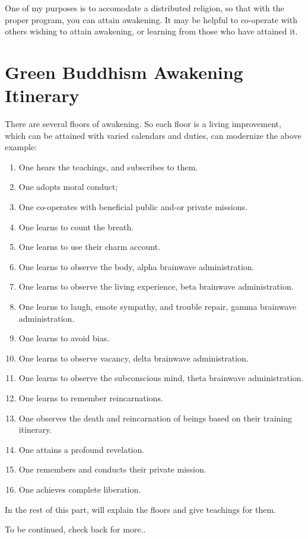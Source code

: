 One of my purposes is to accomodate a distributed religion, 
so that with the proper program, you can attain awakening.
It may be helpful to co-operate with others wishing to attain awakening,
or learning from those who have attained it.

\chapter{Green Buddhism Awakening Itinerary}
There are several floors of awakening. So each floor is a living improvement,
which can be attained with varied calendars and duties,
can modernize the above example:
\begin{enumerate}
  \item  One hears the teachings, and subscribes to them.
  \item  One adopts moral conduct;
  \item  One co-operates with beneficial public and-or private missions.
  \item  One learns to count the breath.
  \item  One learns to use their charm account.
  \item  One learns to observe the body, alpha brainwave administration.
  \item  One learns to observe the living experience, beta brainwave
administration.
  \item  One learns to laugh, emote sympathy, and trouble repair, gamma
brainwave administration.
  \item  One learns to avoid bias.
  \item  One learns to observe vacancy, delta brainwave administration.
  \item  One learns to observe the subconscious mind, theta brainwave
administration.
  \item  One learns to remember reincarnations.
  \item  One observes the death and reincarnation of beings based on their
training itinerary.
  \item  One attains a profound revelation.
  \item  One remembers and conducts their private mission.
  \item One achieves complete liberation.
\end{enumerate}

In the rest of this part, will explain the floors and give teachings for them.

To be continued, check back for more..

